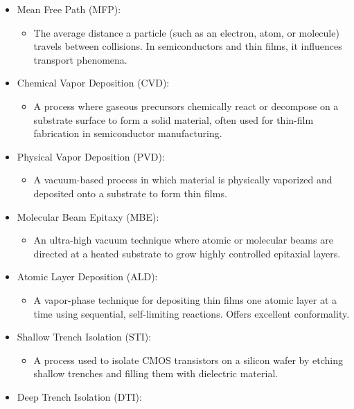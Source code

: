 \documentclass[
]{article}
\providecommand{\tightlist}{%
  \setlength{\itemsep}{0pt}\setlength{\parskip}{0pt}}
\begin{document}
\begin{itemize}
\tightlist
\item
  Mean Free Path (MFP):

  \begin{itemize}
  \tightlist
  \item
    The average distance a particle (such as an electron, atom, or
    molecule) travels between collisions. In semiconductors and thin
    films, it influences transport phenomena.
  \end{itemize}
\item
  Chemical Vapor Deposition (CVD):

  \begin{itemize}
  \tightlist
  \item
    A process where gaseous precursors chemically react or decompose on
    a substrate surface to form a solid material, often used for
    thin-film fabrication in semiconductor manufacturing.
  \end{itemize}
\item
  Physical Vapor Deposition (PVD):

  \begin{itemize}
  \tightlist
  \item
    A vacuum-based process in which material is physically vaporized and
    deposited onto a substrate to form thin films.
  \end{itemize}
\item
  Molecular Beam Epitaxy (MBE):

  \begin{itemize}
  \tightlist
  \item
    An ultra-high vacuum technique where atomic or molecular beams are
    directed at a heated substrate to grow highly controlled epitaxial
    layers.
  \end{itemize}
\item
  Atomic Layer Deposition (ALD):

  \begin{itemize}
  \tightlist
  \item
    A vapor-phase technique for depositing thin films one atomic layer
    at a time using sequential, self-limiting reactions. Offers
    excellent conformality.
  \end{itemize}
\item
  Shallow Trench Isolation (STI):

  \begin{itemize}
  \tightlist
  \item
    A process used to isolate CMOS transistors on a silicon wafer by
    etching shallow trenches and filling them with dielectric material.
  \end{itemize}
\item
  Deep Trench Isolation (DTI):


\end{itemize}
\end{document}
